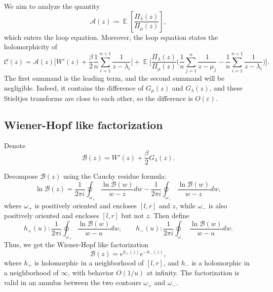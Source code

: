 \documentclass[letterpaper,11pt,oneside,reqno]{article}
\numberwithin{equation}{section}
\theoremstyle{definition}
\begin{document}
We aim to analyze the quantity
\begin{equation*}
	\mathcal{A}(z)\coloneqq\operatorname{\mathbb{E}}\left[ \frac{\Pi_\lambda(z)}{\Pi_\mu(z)} \right],
\end{equation*}
which enters the loop equation. Moreover, the loop equation
states the holomorphicity of
\begin{equation*}
	\mathcal{C}(z)=
	\mathcal{A}(z)\Biggl[ W'(z)+ \frac{\beta}{2}\frac{1}{n}\sum_{i=1}^{n+1}\frac{1}{z-\lambda_i} \Biggr]+
	\operatorname{\mathbb{E}}
	\Biggl[ 
		\frac{\Pi_\lambda(z)}{\Pi_\mu(z)}\Biggl(\frac{1}{n}\sum_{j=1}^{n}\frac{1}{z-\mu_j}-
		\frac{1}{n}\sum_{i=1}^{n+1}\frac{1}{z-\lambda_i}\Biggr)
	\Biggr].
\end{equation*}
The first summand is the leading term, and the second summand will be 
negligible. Indeed, it contains the difference of $G_\mu(z)$ and $G_\lambda(z)$, 
and these Stieltjes transforms are close to each other, so the difference is $O(\varepsilon)$.

\subsection{Wiener-Hopf like factorization}

Denote
\begin{equation*}
	\mathcal{B}(z)=W'(z)+\frac{\beta}{2}G_\lambda(z).
\end{equation*}

Decompose $\mathcal{B}(z)$ using the Cauchy residue formula:
\begin{equation*}
	\ln \mathcal{B}(z)=\frac{1}{2\pi i}\oint_{\omega_+}
	\frac{\ln \mathcal{B}(w)}{w-z}dw-
	\frac{1}{2\pi i}\oint_{\omega_-}
	\frac{\ln \mathcal{B}(w)}{w-z}dw,
\end{equation*}
where $\omega_+$ is positively oriented and encloses $[l,r]$ and $z$,
while $\omega_-$ is also positively oriented and encloses $[l,r]$ but not $z$.
Then define
\begin{equation*}
	h_+(u)\colon \frac{1}{2\pi i}\oint_{\omega_+}
	\frac{\ln \mathcal{B}(w)}{w-u}dw,\qquad 
	h_-(u)\colon \frac{1}{2\pi i}\oint_{\omega_-}
	\frac{\ln \mathcal{B}(w)}{w-u}dw.
\end{equation*}
Thus, we get the Wiener-Hopf like factorization
\begin{equation*}
	\mathcal{B}(z)=e^{h_+(z)}e^{-h_-(z)},
\end{equation*}
where $h_+$ is holomorphic in a neighborhood of $[l,r]$, and 
$h_-$ is a holomorphic in a neighborhood of $\infty$, with behavior $O(1/u)$ at infinity.
The factorization is valid in an annulus between the two contours $\omega_+$ and $\omega_-$.
\end{document}
